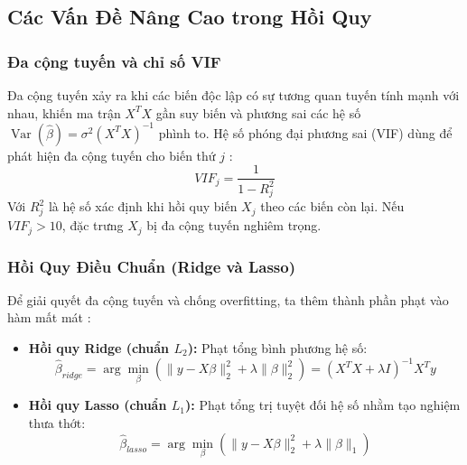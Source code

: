 \documentclass[12pt,a4paper]{article}
\begin{document}
\subsection{Các Vấn Đề Nâng Cao trong Hồi Quy}

\subsubsection{Đa cộng tuyến và chỉ số VIF}
Đa cộng tuyến xảy ra khi các biến độc lập có sự tương quan tuyến tính mạnh với nhau, khiến ma trận $X^T X$ gần suy biến và phương sai các hệ số $\operatorname{Var}(\hat{\beta}) = \sigma^2 (X^T X)^{-1}$ phình to. Hệ số phóng đại phương sai (VIF) dùng để phát hiện đa cộng tuyến cho biến thứ $j$ \cite{james}:
\begin{equation}
    VIF_j = \frac{1}{1 - R_j^2}
\end{equation}
Với $R_j^2$ là hệ số xác định khi hồi quy biến $X_j$ theo các biến còn lại. Nếu $VIF_j > 10$, đặc trưng $X_j$ bị đa cộng tuyến nghiêm trọng.

\subsubsection{Hồi Quy Điều Chuẩn (Ridge và Lasso)}
Để giải quyết đa cộng tuyến và chống overfitting, ta thêm thành phần phạt vào hàm mất mát \cite{hastie}:
\begin{itemize}
    \item \textbf{Hồi quy Ridge (chuẩn $L_2$):} Phạt tổng bình phương hệ số:
    \begin{equation}
        \hat{\beta}_{ridge} = \arg\min_{\beta} \left( \|y - X\beta\|_2^2 + \lambda \|\beta\|_2^2 \right) = (X^T X + \lambda I)^{-1} X^T y
    \end{equation}
    \item \textbf{Hồi quy Lasso (chuẩn $L_1$):} Phạt tổng trị tuyệt đối hệ số nhằm tạo nghiệm thưa thớt:
    \begin{equation}
        \hat{\beta}_{lasso} = \arg\min_{\beta} \left( \|y - X\beta\|_2^2 + \lambda \|\beta\|_1 \right)
    \end{equation}
\end{itemize}
\end{document}

